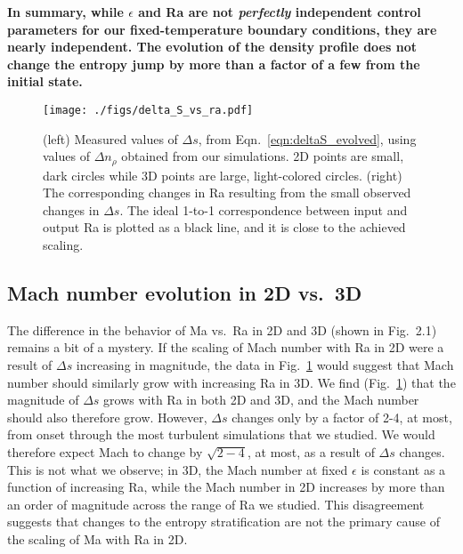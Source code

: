 \documentclass[aps, pre, onecolumn, nofootinbib, notitlepage, groupedaddress, amsfonts, amssymb, amsmath, longbibliography, superscriptaddress]{revtex4-1}
\begin{document}
\textbf{In summary, while $\epsilon$ and Ra are not \emph{perfectly} independent control parameters for our fixed-temperature boundary conditions, they are nearly independent.
The evolution of the density profile does not change the entropy jump by more than a factor of a few from the initial state.}


\begin{figure}[t!]
\texttt{[image: ./figs/delta\_S\_vs\_ra.pdf]}
\caption{ (left) Measured values of $\Delta s$, from Eqn.~\ref{eqn:deltaS_evolved}, using values of $\Delta n_\rho$ obtained from our simulations.
		  2D points are small, dark circles while 3D points are large, light-colored circles.
		  (right) The corresponding changes in Ra resulting from the small observed changes in $\Delta s$.
		  The ideal 1-to-1 correspondence between input and output Ra is plotted as a black line, and it is close to the achieved scaling.
	\label{fig:delta_S_vs_ra} }
\end{figure}


\subsection{Mach number evolution in 2D vs.~3D}
The difference in the behavior of Ma vs.~Ra in 2D and 3D (shown in Fig.~2.1) remains a bit of a mystery.
If the scaling of Mach number with Ra in 2D were a result of $\Delta s$ increasing in magnitude, the data in Fig.~\ref{fig:delta_S_vs_ra} would suggest that Mach number should similarly grow with increasing Ra in 3D.
We find (Fig.~\ref{fig:delta_S_vs_ra}) that the magnitude of $\Delta s$ grows with Ra in both 2D and 3D, and the Mach number should also therefore grow.
However, $\Delta s$ changes only by a factor of 2-4, at most, from onset through the most turbulent simulations that we studied.
We would therefore expect Mach to change by $\sqrt{2-4}$, at most, as a result of $\Delta s$ changes.
This is not what we observe; in 3D, the Mach number at fixed $\epsilon$ is constant as a function of increasing Ra, while the Mach number in 2D increases by more than an order of magnitude across the range of Ra we studied.
This disagreement suggests that changes to the entropy stratification are not the primary cause of the scaling of Ma with Ra in 2D.
\end{document}
